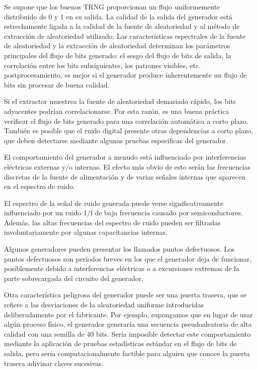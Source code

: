 			Se supone que los buenos TRNG proporcionan un flujo uniformemente distribuido de 0 y 1 en su salida. La calidad de la salida del generador está estrechamente ligada a la calidad de la fuente de aleatoriedad y al método de extracción de aleatoriedad utilizado. Las características espectrales de la fuente de aleatoriedad y la extracción de aleatoriedad determinan los parámetros principales del flujo de bits generado: el sesgo del flujo de bits de salida, la correlación entre los bits subsiguientes, los patrones visibles, etc. postprocesamiento, es mejor si el generador produce inherentemente un flujo de bits sin procesar de buena calidad.
			
			Si el extractor muestrea la fuente de aleatoriedad demasiado rápido, los bits adyacentes podrían correlacionarse. Por esta razón, es una buena práctica verificar el flujo de bits generado para una correlación automática a corto plazo. También es posible que el ruido digital presente otras dependencias a corto plazo, que deben detectarse mediante algunas pruebas específicas del generador.
			
			El comportamiento del generador a menudo está influenciado por interferencias eléctricas externas y/o internas. El efecto más obvio de esto serán las frecuencias discretas de la fuente de alimentación y de varias señales internas que aparecen en el espectro de ruido.
			
			El espectro de la señal de ruido generada puede verse significativamente influenciado por un ruido 1/f de baja frecuencia causado por semiconductores. Además, las altas frecuencias del espectro de ruido pueden ser filtradas involuntariamente por algunas capacitancias internas.
			
			Algunos generadores pueden presentar los llamados puntos defectuosos. Los puntos defectuosos son períodos breves en los que el generador deja de funcionar, posiblemente debido a interferencias eléctricas o a excursiones extremas de la parte sobrecargada del circuito del generador.
			
			Otra característica peligrosa del generador puede ser una puerta trasera, que se refiere a las desviaciones de la aleatoriedad uniforme introducidas deliberadamente por el fabricante. Por ejemplo, supongamos que en lugar de usar algún proceso físico, el generador generaría una secuencia pseudoaleatoria de alta calidad con una semilla de 40 bits. Sería imposible detectar este comportamiento mediante la aplicación de pruebas estadísticas estándar en el flujo de bits de salida, pero sería computacionalmente factible para alguien que conoce la puerta trasera adivinar claves sucesivas.
			
